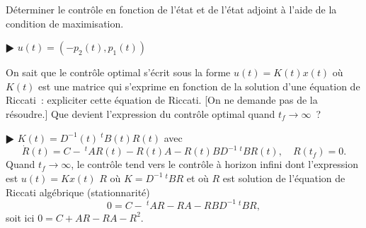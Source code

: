\documentclass[11pt,a4paper]{article}
\def\iy{\infty}
\def\t{\ \!^t\!}
\theoremstyle{plain}
\theoremstyle{definition}
\begin{document}
\begin{Exercice}[6 points]
\begin{Question} D\'eterminer le contr\^ole en fonction de l'\'etat et de l'\'etat
adjoint \`a l'aide de la condition de maximisation.
\end{Question}
\begin{corr} $\RHD$ $u(t)=(-p_2(t),p_1(t))$
\end{corr}

\begin{Question} On sait que le contr\^ole optimal s'\'ecrit sous la
forme $u(t)=K(t)x(t)$ o\`u $K(t)$ est une matrice qui s'exprime en fonction de la
solution d'une \'equation de Riccati~: expliciter cette \'equation de Riccati.
[On ne demande pas de la r\'esoudre.] Que devient l'expression du contr\^ole optimal
quand $t_f \to \iy$~?
\end{Question}
\begin{corr} $\RHD$ $K(t)=D^{-1}(t)\t B(t)R(t)$ avec
\[ \dot{R}(t)=C-\t AR(t)-R(t)A-R(t)BD^{-1}\t BR(t),\quad
   R(t_f)=0. \]
Quand $t_f \to \iy$, le contr\^ole tend vers le contr\^ole \`a horizon infini dont
l'expression est $u(t)=Kx(t)$ $R$ o\`u $K=D^{-1}\t BR$ et o\`u $R$ est
solution de l'\'equation de Riccati alg\'ebrique (stationnarit\'e)
\[ 0 = C-\t AR-RA-RBD^{-1}\t BR, \]
soit ici $0=C+AR-RA-R^2$.
\end{corr}

\end{Exercice}
\end{document}
